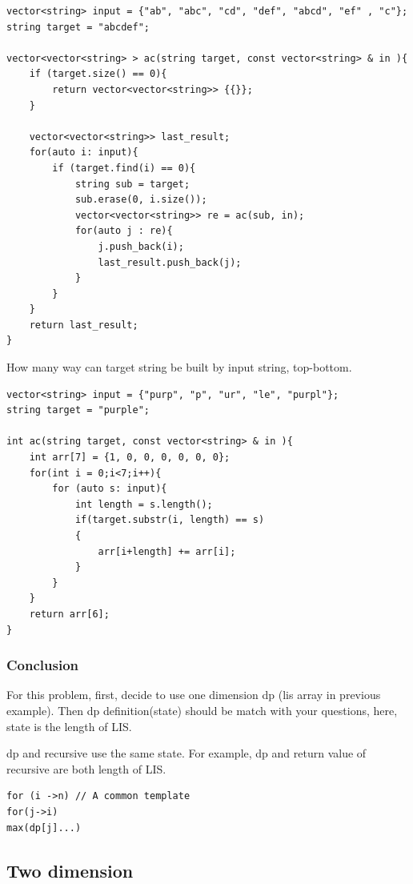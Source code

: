 \documentclass[a4paper,11pt,twoside]{book}
\begin{document}
\begin{lstlisting}[numbers=none]
vector<string> input = {"ab", "abc", "cd", "def", "abcd", "ef" , "c"};
string target = "abcdef";

vector<vector<string> > ac(string target, const vector<string> & in ){
	if (target.size() == 0){
		return vector<vector<string>> {{}};
	}
	
	vector<vector<string>> last_result;
	for(auto i: input){
		if (target.find(i) == 0){
			string sub = target;
			sub.erase(0, i.size());
			vector<vector<string>> re = ac(sub, in);
			for(auto j : re){
				j.push_back(i);
				last_result.push_back(j);
			}
		}
	}
	return last_result;
}	
\end{lstlisting} 	
	
	\par How many way can target string be built by input string, top-bottom.
\begin{lstlisting}[numbers=none]
vector<string> input = {"purp", "p", "ur", "le", "purpl"};
string target = "purple";

int ac(string target, const vector<string> & in ){	
	int arr[7] = {1, 0, 0, 0, 0, 0, 0};
	for(int i = 0;i<7;i++){
		for (auto s: input){
			int length = s.length();
			if(target.substr(i, length) == s)
			{
				arr[i+length] += arr[i];
			}		
		}
	}	
	return arr[6];
}	
\end{lstlisting} 	
	


\subsubsection{Conclusion}

	\par For this problem, first, decide to use one dimension dp (lis array in previous example). Then dp definition(state) should be match with your questions, here, state is the length of LIS. 
	
	\par dp and recursive use the same state. For example, dp and return value of recursive are both length of LIS.
	
\begin{lstlisting}[numbers=none]
for (i ->n) // A common template
for(j->i)
max(dp[j]...)	
\end{lstlisting}	
	

\subsection{Two dimension}
\end{document}
